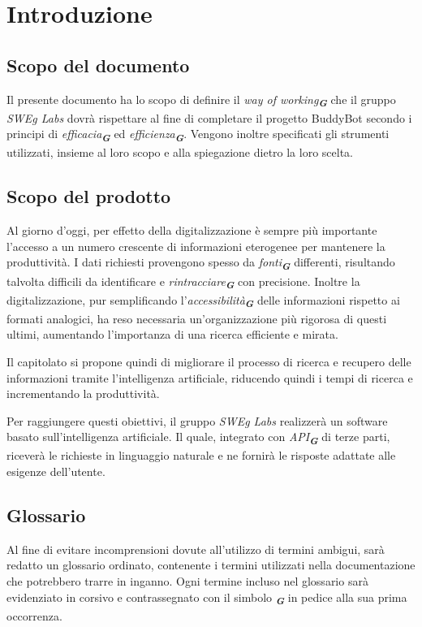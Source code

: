 


\section{Introduzione}
\label{sec:introduzione}

\subsection{Scopo del documento}
Il presente documento ha lo scopo di definire il \emph{way of working}\textsubscript{\textit{\textbf{G}}} che il gruppo \emph{SWEg Labs} dovrà rispettare al fine di completare il progetto BuddyBot secondo i principi di \emph{efficacia}\textsubscript{\textit{\textbf{G}}} ed \emph{efficienza}\textsubscript{\textit{\textbf{G}}}.
Vengono inoltre specificati gli strumenti utilizzati, insieme al loro scopo e alla spiegazione dietro la loro scelta.
\subsection{Scopo del prodotto}
Al giorno d'oggi, per effetto della digitalizzazione è sempre più importante l'accesso a un numero crescente di informazioni eterogenee per mantenere la produttività. I dati richiesti provengono spesso da  \emph{fonti}\textsubscript{\textit{\textbf{G}}} differenti, risultando talvolta difficili da identificare e  \emph{rintracciare}\textsubscript{\textit{\textbf{G}}} con precisione. Inoltre la digitalizzazione, pur semplificando l'\emph{accessibilità}\textsubscript{\textit{\textbf{G}}} delle informazioni rispetto ai formati analogici, ha reso necessaria un'organizzazione più rigorosa di questi ultimi, aumentando l'importanza di una ricerca efficiente e mirata.

Il capitolato si propone quindi di migliorare il processo di ricerca e recupero delle informazioni tramite l'intelligenza artificiale, riducendo quindi i tempi di ricerca e incrementando la produttività.

Per raggiungere questi obiettivi, il gruppo \emph{SWEg Labs} realizzerà un software basato sull'intelligenza artificiale. Il quale, integrato con \emph{API}\textsubscript{\textit{\textbf{G}}} di terze parti, riceverà le richieste in linguaggio naturale e ne fornirà le risposte adattate alle esigenze dell'utente.
\subsection{Glossario}
Al fine di evitare incomprensioni dovute all'utilizzo di termini ambigui, sarà redatto un glossario ordinato, contenente i termini utilizzati nella documentazione che potrebbero trarre in inganno. Ogni termine incluso nel glossario sarà evidenziato in corsivo e contrassegnato con il simbolo \textsubscript{\textit{\textbf{G}}} in pedice alla sua prima occorrenza.

